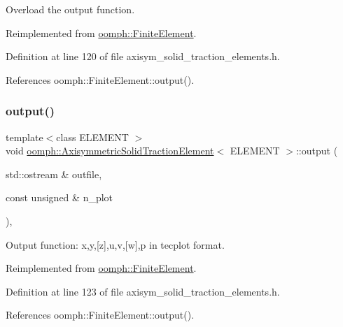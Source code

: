 Overload the output function. 



Reimplemented from \hyperlink{classoomph_1_1FiniteElement_a2ad98a3d2ef4999f1bef62c0ff13f2a7}{oomph\+::\+Finite\+Element}.



Definition at line 120 of file axisym\+\_\+solid\+\_\+traction\+\_\+elements.\+h.



References oomph\+::\+Finite\+Element\+::output().

\mbox{\label{classoomph_1_1AxisymmetricSolidTractionElement_a018d7c00d4eacabec5f9c30968b6bab7}} 
\subsubsection{\texorpdfstring{output()}{output()}\hspace{0.1cm}{\footnotesize\ttfamily [2/4]}}
{\footnotesize\ttfamily template$<$class E\+L\+E\+M\+E\+NT $>$ \\
void \hyperlink{classoomph_1_1AxisymmetricSolidTractionElement}{oomph\+::\+Axisymmetric\+Solid\+Traction\+Element}$<$ E\+L\+E\+M\+E\+NT $>$\+::output (\begin{DoxyParamCaption}\item[{std\+::ostream \&}]{outfile,  }\item[{const unsigned \&}]{n\+\_\+plot }\end{DoxyParamCaption})\hspace{0.3cm}{\ttfamily [inline]}, {\ttfamily [virtual]}}



Output function\+: x,y,\mbox{[}z\mbox{]},u,v,\mbox{[}w\mbox{]},p in tecplot format. 



Reimplemented from \hyperlink{classoomph_1_1FiniteElement_afa9d9b2670f999b43e6679c9dd28c457}{oomph\+::\+Finite\+Element}.



Definition at line 123 of file axisym\+\_\+solid\+\_\+traction\+\_\+elements.\+h.



References oomph\+::\+Finite\+Element\+::output().

